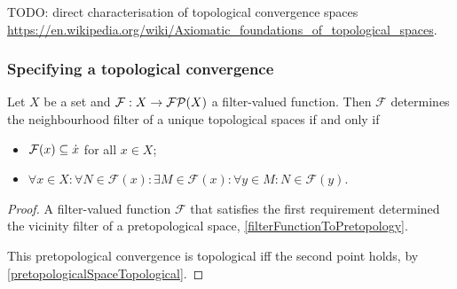 TODO: direct characterisation of topological convergence spaces \url{https://en.wikipedia.org/wiki/Axiomatic_foundations_of_topological_spaces}.

\subsubsection{Specifying a topological convergence}

\begin{proposition}
Let $X$ be a set and $\mathcal{F}: X\to \operatorname{\mathcal{FP}}(X)$ a filter-valued function. Then $\mathcal{F}$ determines the neighbourhood filter of a unique topological spaces \textup{if and only if}
\begin{itemize}
\item $\mathcal{F}(x)\subseteq \dot{x}$ for all $x\in X$;
\item $\forall x\in X: \forall N\in \mathcal{F}(x): \exists M\in \mathcal{F}(x): \forall y\in M: N\in \mathcal{F}(y)$.
\end{itemize}
\end{proposition}
\begin{proof}
A filter-valued function $\mathcal{F}$ that satisfies the first requirement determined the vicinity filter of a pretopological space, \ref{filterFunctionToPretopology}.

This pretopological convergence is topological iff the second point holds, by \ref{pretopologicalSpaceTopological}.
\end{proof}

